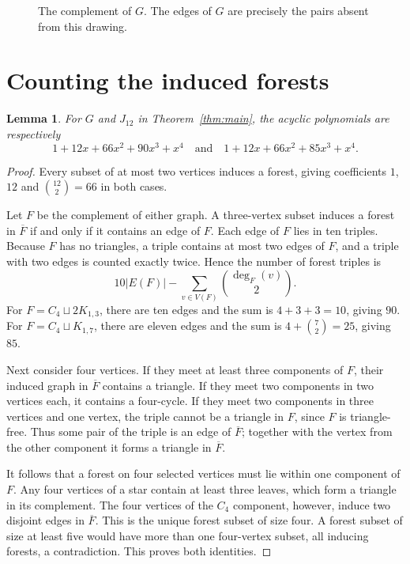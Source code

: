 \documentclass[11pt]{article}
\newtheorem{lemma}[theorem]{Lemma}
\begin{document}
\begin{figure}[ht]
\centering
{}
\caption{The complement of $G$. The edges of $G$ are precisely the pairs absent from this drawing.}
\label{fig:complement}
\end{figure}

\section{Counting the induced forests}
\begin{lemma}\label{lem:count}
For $G$ and $J_{12}$ in Theorem~\ref{thm:main}, the acyclic polynomials are respectively
\[
 1+12x+66x^2+90x^3+x^4
 \quad\text{and}\quad
 1+12x+66x^2+85x^3+x^4.
\]
\end{lemma}
\begin{proof}
Every subset of at most two vertices induces a forest, giving coefficients $1$, $12$ and $\binom{12}{2}=66$ in both cases.

Let $F$ be the complement of either graph. A three-vertex subset induces a forest in $\overline F$ if and only if it contains an edge of $F$. Each edge of $F$ lies in ten triples. Because $F$ has no triangles, a triple contains at most two edges of $F$, and a triple with two edges is counted exactly twice. Hence the number of forest triples is
\[
 10|E(F)|-\sum_{v\in V(F)}\binom{\deg_F(v)}2.
\]
For $F=C_4\sqcup2K_{1,3}$, there are ten edges and the sum is $4+3+3=10$, giving $90$. For $F=C_4\sqcup K_{1,7}$, there are eleven edges and the sum is $4+\binom72=25$, giving $85$.

Next consider four vertices. If they meet at least three components of $F$, their induced graph in $\overline F$ contains a triangle. If they meet two components in two vertices each, it contains a four-cycle. If they meet two components in three vertices and one vertex, the triple cannot be a triangle in $F$, since $F$ is triangle-free. Thus some pair of the triple is an edge of $\overline F$; together with the vertex from the other component it forms a triangle in $\overline F$.

It follows that a forest on four selected vertices must lie within one component of $F$. Any four vertices of a star contain at least three leaves, which form a triangle in its complement. The four vertices of the $C_4$ component, however, induce two disjoint edges in $\overline F$. This is the unique forest subset of size four. A forest subset of size at least five would have more than one four-vertex subset, all inducing forests, a contradiction. This proves both identities.
\end{proof}
\end{document}
